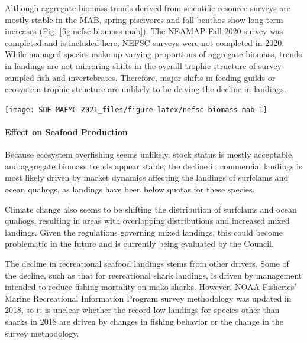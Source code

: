 \documentclass[
  10pt,
]{article}
\let\origfigure\figure
\let\endorigfigure\endfigure
\renewenvironment{figure}[1][2] {
    \expandafter\origfigure\expandafter[H]
} {
    \endorigfigure
}
\begin{document}
Although aggregate biomass trends derived from scientific resource
surveys are mostly stable in the MAB, spring piscivores and fall benthos
show long-term increases (Fig. \ref{fig:nefsc-biomass-mab}). The NEAMAP
Fall 2020 survey was completed and is included here; NEFSC surveys were
not completed in 2020. While managed species make up varying proportions
of aggregate biomass, trends in landings are not mirroring shifts in the
overall trophic structure of survey-sampled fish and invertebrates.
Therefore, major shifts in feeding guilds or ecosystem trophic structure
are unlikely to be driving the decline in landings.

\begin{figure}

{\centering \texttt{[image: SOE-MAFMC-2021\_files/figure-latex/nefsc-biomass-mab-1]} 

}

\caption{Spring (left) and fall (right) surveyed biomass in the Mid-Atlantic Bight. Data from the NEFSC Bottom Trawl Survey are shown in black, with NEAMAP shown in red. The shaded area around each annual mean represents 2 standard deviations from the mean.}\label{fig:nefsc-biomass-mab}
\end{figure}

\hypertarget{effect-on-seafood-production}{%
\paragraph{Effect on Seafood
Production}\label{effect-on-seafood-production}}

Because ecosystem overfishing seems unlikely, stock status is mostly
acceptable, and aggregate biomass trends appear stable, the decline in
commercial landings is most likely driven by market dynamics affecting
the landings of surfclams and ocean quahogs, as landings have been below
quotas for these species.

Climate change also seems to be shifting the distribution of surfclams
and ocean quahogs, resulting in areas with overlapping distributions and
increased mixed landings. Given the regulations governing mixed
landings, this could become problematic in the future and is currently
being evaluated by the Council.

The decline in recreational seafood landings stems from other drivers.
Some of the decline, such as that for recreational shark landings, is
driven by management intended to reduce fishing mortality on mako
sharks. However, NOAA Fisheries' Marine Recreational Information Program
survey methodology was updated in 2018, so it is unclear whether the
record-low landings for species other than sharks in 2018 are driven by
changes in fishing behavior or the change in the survey methodology.
\end{document}
